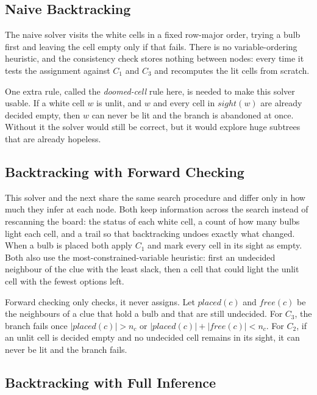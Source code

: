 \documentclass[12pt]{report}
\begin{document}
\subsection{Naive Backtracking}

  The naive solver visits the white cells in a fixed row-major order, trying a bulb first
  and leaving the cell empty only if that fails. There is no variable-ordering heuristic,
  and the consistency check stores nothing between nodes: every time it tests the
  assignment against $C_1$ and $C_3$ and recomputes the lit cells from scratch.

  One extra rule, called the \emph{doomed-cell} rule here, is needed to make this solver
  usable. If a white cell $w$ is unlit, and $w$ and every cell in $\mathit{sight}(w)$ are
  already decided empty, then $w$ can never be lit and the branch is abandoned at once.
  Without it the solver would still be correct, but it would explore huge subtrees that are
  already hopeless.


\subsection{Backtracking with Forward Checking}

  This solver and the next share the same search procedure and differ only in how much they
  infer at each node. Both keep information across the search instead of rescanning the
  board: the status of each white cell, a count of how many bulbs light each cell, and a
  trail so that backtracking undoes exactly what changed. When a bulb is placed both apply
  $C_1$ and mark every cell in its sight as empty. Both also use the
  most-constrained-variable heuristic: first an undecided neighbour of the clue with the
  least slack, then a cell that could light the unlit cell with the fewest options left.

  Forward checking only checks, it never assigns. Let $\mathit{placed}(c)$ and
  $\mathit{free}(c)$ be the neighbours of a clue that hold a bulb and that are still
  undecided. For $C_3$, the branch fails once $|\mathit{placed}(c)| > n_c$ or
  $|\mathit{placed}(c)| + |\mathit{free}(c)| < n_c$. For $C_2$, if an unlit cell is decided
  empty and no undecided cell remains in its sight, it can never be lit and the branch fails.


\subsection{Backtracking with Full Inference}
\end{document}
